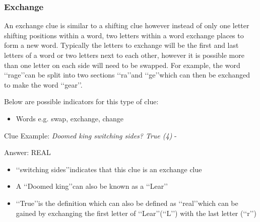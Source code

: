 \subsubsection{Exchange}

An exchange clue is similar to a shifting clue however instead of only one letter shifting positions within a word, two letters within a word exchange places to form a new word. Typically the letters to exchange will be the first and last letters of a word or two letters next to each other, however it is possible more than one letter on each side will need to be swapped. For example, the word \lq\lq rage\rq\rq can be split into two sections \lq\lq ra\rq\rq and \lq\lq ge\rq\rq which can then be exchanged to make the word \lq\lq gear\rq\rq.   

Below are possible indicators for this type of clue:
\begin{itemize} 
	\item Words e.g. swap, exchange, change 
\\
\end{itemize}



Clue Example: \emph{Doomed king switching sides? True (4)}  - \citep{shuchiExchange09}

Answer: REAL 

\begin{itemize}
	\item \lq\lq switching sides\rq\rq indicates that this clue is an exchange clue 
	\item A \lq\lq Doomed king\rq\rq can also be known as a \lq\lq Lear\rq\rq
	\item \lq\lq True\rq\rq is the definition which can also be defined as \lq\lq real\rq\rq which can be gained by exchanging the first letter of \lq\lq Lear\rq\rq (\lq\lq L\rq\rq) with the last letter (\lq\lq r\rq\rq) 
\end{itemize}